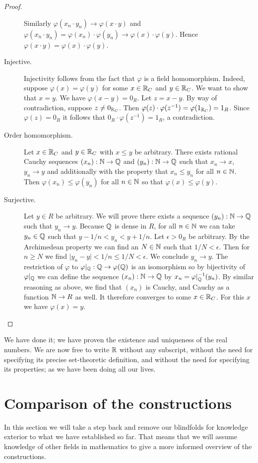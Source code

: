 \documentclass[../main.tex]{subfiles}
\begin{document}
\begin{proof}
\begin{description}
        Similarly $\varphi(x_n\cdot y_n)\to\varphi(x\cdot y)$ and $\varphi(x_n\cdot y_n)=\varphi(x_n)\cdot\varphi(y_n)\to\varphi(x)\cdot\varphi(y)$. Hence $\varphi(x\cdot y)=\varphi(x)\cdot\varphi(y)$.
        \item[Injective.] Injectivity follows from the fact that $\varphi$ is a field homomorphism. Indeed, suppose $\varphi(x)=\varphi(y)$ for some $x\in\mathbb{R}_C$ and $y\in\mathbb{R}_C$. We want to show that $x=y$. We have $\varphi(x-y)=0_R$. Let $z=x-y$. By way of contradiction, suppose $z\neq0_{\mathbb{R}_C}$. Then $\varphi(z)\cdot\varphi(z^{-1})=\varphi(1_{\mathbb{R}_C})=1_R$. Since $\varphi(z)=0_R$ it follows that $0_R\cdot\varphi(z^{-1})=1_R$, a contradiction.
        \item[Order homomorphism.] Let $x\in\mathbb{R}_C$ and $y\in\mathbb{R}_C$ with $x\leq y$ be arbitrary. There exists rational Cauchy sequences $(x_n):\mathbb{N}\to\mathbb{Q}$ and $(y_n):\mathbb{N}\to\mathbb{Q}$ such that $x_n\to x$, $y_n\to y$ and additionally with the property that $x_n\leq y_n$ for all $n\in\mathbb{N}$. Then $\varphi(x_n)\leq\varphi(y_n)$ for all $n\in\mathbb{N}$ so that $\varphi(x)\leq\varphi(y)$.
        \item[Surjective.] Let $y\in R$ be arbitrary. We will prove there exists a sequence $(y_n):\mathbb{N}\to\mathbb{Q}$ such that $y_n\to y$. Because $\mathbb{Q}$ is dense in $R$, for all $n\in\mathbb{N}$ we can take $y_n\in\mathbb{Q}$ such that $y-1/n<y_n<y+1/n$. Let $\epsilon>0_R$ be arbitrary. By the Archimedean property we can find an $N\in\mathbb{N}$ such that $1/N<\epsilon$. Then for $n\geq N$ we find $\vert y_n-y\vert<1/n\leq1/N<\epsilon$. We conclude $y_n\to y$. The restriction of $\varphi$ to $\varphi\vert_{\mathbb{Q}}:\mathbb{Q}\to\varphi(\mathbb{Q})$ is an isomorphism so by bijectivity of $\varphi\vert_{\mathbb{Q}}$ we can define the sequence $(x_n):\mathbb{N}\to\mathbb{Q}$ by $x_n=\varphi\vert_{\mathbb{Q}}^{-1}(y_n)$. By similar reasoning as above, we find that $(x_n)$ is Cauchy, and Cauchy as a function $\mathbb{N}\to R$ as well. It therefore converges to some $x\in\mathbb{R}_C$. For this $x$ we have $\varphi(x)=y$.
    \end{description}
\end{proof}
We have done it; we have proven the existence and uniqueness of the real numbers. We are now free to write $\mathbb{R}$ without any subscript, without the need for specifying its precise set-theoretic definition, and without the need for specifying its properties; as we have been doing all our lives.

\section{Comparison of the constructions}\label{sec:the_real_numbers:comparison_of_the_constructions}
In this section we will take a step back and remove our blindfolds for knowledge exterior to what we have established so far. That means that we will assume knowledge of other fields in mathematics to give a more informed overview of the constructions.
\end{document}
